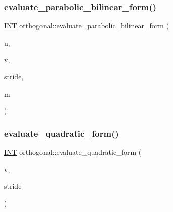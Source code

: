 \subsubsection{\texorpdfstring{evaluate\+\_\+parabolic\+\_\+bilinear\+\_\+form()}{evaluate\_parabolic\_bilinear\_form()}}
{\footnotesize\ttfamily \mbox{\hyperlink{galois_8h_a09fddde158a3a20bd2dcadb609de11dc}{I\+NT}} orthogonal\+::evaluate\+\_\+parabolic\+\_\+bilinear\+\_\+form (\begin{DoxyParamCaption}\item[{\mbox{\hyperlink{galois_8h_a09fddde158a3a20bd2dcadb609de11dc}{I\+NT}} $\ast$}]{u,  }\item[{\mbox{\hyperlink{galois_8h_a09fddde158a3a20bd2dcadb609de11dc}{I\+NT}} $\ast$}]{v,  }\item[{\mbox{\hyperlink{galois_8h_a09fddde158a3a20bd2dcadb609de11dc}{I\+NT}}}]{stride,  }\item[{\mbox{\hyperlink{galois_8h_a09fddde158a3a20bd2dcadb609de11dc}{I\+NT}}}]{m }\end{DoxyParamCaption})}

\mbox{\label{classorthogonal_ad1654c2024a7cd213942ee1d0acdb82a}} 
\subsubsection{\texorpdfstring{evaluate\+\_\+quadratic\+\_\+form()}{evaluate\_quadratic\_form()}}
{\footnotesize\ttfamily \mbox{\hyperlink{galois_8h_a09fddde158a3a20bd2dcadb609de11dc}{I\+NT}} orthogonal\+::evaluate\+\_\+quadratic\+\_\+form (\begin{DoxyParamCaption}\item[{\mbox{\hyperlink{galois_8h_a09fddde158a3a20bd2dcadb609de11dc}{I\+NT}} $\ast$}]{v,  }\item[{\mbox{\hyperlink{galois_8h_a09fddde158a3a20bd2dcadb609de11dc}{I\+NT}}}]{stride }\end{DoxyParamCaption})}

\mbox{\label{classorthogonal_a2c9abcf612036b37e206ae1f0718c6b2}} 
